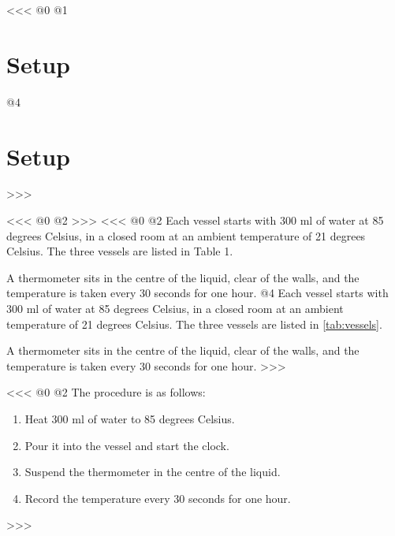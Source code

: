 <<<
@0
@1
\section{Setup}
@4
\section{Setup}\label{sec:setup}
>>>

<<<
@0
@2
>>>
<<<
@0
@2
Each vessel starts with 300 ml of water at 85 degrees Celsius,
in a closed room at an ambient temperature of 21 degrees Celsius.
The three vessels are listed in Table 1.

A thermometer sits in the centre of the liquid, clear of the walls,
and the temperature is taken every 30 seconds for one hour.
@4
Each vessel starts with 300 ml of water at 85 degrees Celsius,
in a closed room at an ambient temperature of 21 degrees Celsius.
The three vessels are listed in \autoref{tab:vessels}.

A thermometer sits in the centre of the liquid, clear of the walls,
and the temperature is taken every 30 seconds for one hour.
>>>

<<<
@0
@2
The procedure is as follows:
\begin{enumerate}
    \item Heat 300 ml of water to 85 degrees Celsius.
    \item Pour it into the vessel and start the clock.
    \item Suspend the thermometer in the centre of the liquid.
    \item Record the temperature every 30 seconds for one hour.
\end{enumerate}
>>>

